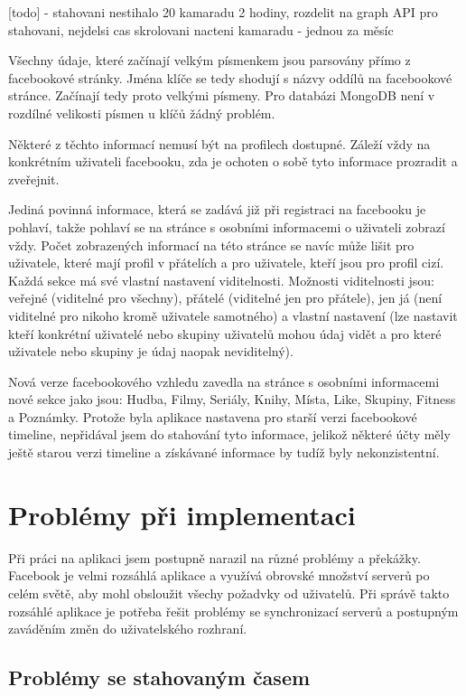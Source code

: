 \documentclass[thesis=M,czech]{FITthesis}[2013/05/10]
\begin{document}
[todo] - stahovani nestihalo 20 kamaradu 2 hodiny, rozdelit na graph API pro stahovani, nejdelsi cas skrolovani nacteni kamaradu - jednou za měsíc


Všechny údaje, které začínají velkým písmenkem jsou parsovány přímo z facebookové stránky. Jména klíče se tedy shodují s názvy oddílů na facebookové stránce. Začínají tedy proto velkými písmeny. Pro databázi MongoDB není v rozdílné velikosti písmen u klíčů žádný problém.

Některé z těchto informací nemusí být na profilech dostupné. Záleží vždy na konkrétním uživateli facebooku, zda je ochoten o sobě tyto informace prozradit a zveřejnit.

Jediná povinná informace, která se zadává již při registraci na facebooku je pohlaví, takže pohlaví se na stránce s osobními informacemi o uživateli zobrazí vždy. Počet zobrazených informací na této stránce se navíc může lišit pro uživatele, které mají profil v přátelích a pro uživatele, kteří jsou pro profil cizí. Každá sekce má své vlastní nastavení viditelnosti. Možnosti viditelnosti jsou: veřejné (viditelné pro všechny), přátelé (viditelné jen pro přátele), jen já (není viditelné pro nikoho kromě uživatele samotného) a vlastní nastavení (lze nastavit kteří konkrétní uživatelé nebo skupiny uživatelů mohou údaj vidět a pro které uživatele nebo skupiny je údaj naopak neviditelný).

Nová verze facebookového vzhledu zavedla na stránce s osobními informacemi nové sekce jako jsou: Hudba, Filmy, Seriály, Knihy, Místa, Like, Skupiny, Fitness a Poznámky. Protože byla aplikace nastavena pro starší verzi facebookové timeline, nepřidával jsem do stahování tyto informace, jelikož některé účty měly ještě starou verzi timeline a získávané informace by tudíž byly nekonzistentní.



\section{Problémy při implementaci}

Při práci na aplikaci jsem postupně narazil na různé problémy a překážky. Facebook je velmi rozsáhlá aplikace a využívá obrovské množství serverů po celém světě, aby mohl obsloužit všechy požadvky od uživatelů. Při správě takto rozsáhlé aplikace je potřeba řešit problémy se synchronizací serverů a postupným zaváděním změn do uživatelského rozhraní.

\subsection{Problémy se stahovaným časem}
\end{document}
